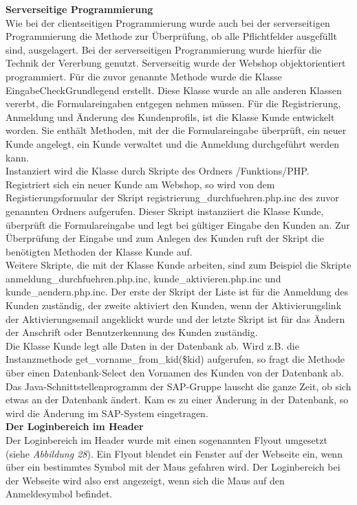 \textbf{Serverseitige Programmierung}\\
Wie bei der clientseitigen Programmierung wurde auch bei der serverseitigen Programmierung die Methode zur Überprüfung, ob alle Pflichtfelder ausgefüllt sind, ausgelagert. Bei der serverseitigen Programmierung wurde hierfür die Technik der Vererbung genutzt. Serverseitig wurde der Webshop objektorientiert programmiert. Für die zuvor genannte Methode wurde die Klasse \glqq EingabeCheckGrundlegend\grqq{} erstellt. Diese Klasse wurde an alle anderen Klassen vererbt, die Formulareingaben entgegen nehmen müssen. Für die Registrierung, Anmeldung und Änderung des Kundenprofils, ist die Klasse \glqq Kunde\grqq{} entwickelt worden. Sie enthält Methoden, mit der die Formulareingabe überprüft, ein neuer Kunde angelegt, ein Kunde verwaltet und die Anmeldung durchgeführt werden kann.\\
Instanziert wird die Klasse durch Skripte des Ordners \glqq /Funktions/PHP\grqq{}. Registriert sich ein neuer Kunde am Webshop, so wird von dem Registierungsformular der Skript \glqq registrierung\_durchfuehren.php.inc\grqq{} des zuvor genannten Ordners aufgerufen. Dieser Skript instanziiert die Klasse \glqq Kunde\grqq{}, überprüft die Formulareingabe und legt bei gültiger Eingabe den Kunden an. Zur Überprüfung der Eingabe und zum Anlegen des Kunden ruft der Skript die benötigten Methoden der Klasse \glqq Kunde\grqq{} auf.\\
Weitere Skripte, die mit der Klasse \glqq Kunde\grqq{} arbeiten, sind zum Beispiel die Skripte \glqq anmeldung\_durchfuehren.php.inc\grqq{}, \glqq kunde\_aktivieren.php.inc\grqq{} und \glqq kunde\_aendern.php.inc\grqq{}. Der erste der Skript der Liste ist für die Anmeldung des Kunden zuständig, der zweite aktiviert den Kunden, wenn der Aktivierungslink der Aktivierungsemail angeklickt wurde und der letzte Skript ist für das Ändern der Anschrift oder Benutzerkennung des Kunden zuständig.\\
Die Klasse \glqq Kunde\grqq{} legt alle Daten in der Datenbank ab. Wird z.B. die Instanzmethode \glqq get\_vorname\_from\_kid(\$kid)\grqq{} aufgerufen, so fragt die Methode über einen Datenbank-Select den Vornamen des Kunden von der Datenbank ab. Das Java-Schnittstellenprogramm der SAP-Gruppe lauscht die ganze Zeit, ob sich etwas an der Datenbank ändert. Kam es zu einer Änderung in der Datenbank, so wird die Änderung im SAP-System eingetragen.\\

\textbf{Der Loginbereich im Header}\\
Der Loginbereich im Header wurde mit einen sogenannten \glqq Flyout\grqq{} umgesetzt (siehe \textit{Abbildung 28}). Ein Flyout blendet ein Fenster auf der Webseite ein, wenn über ein bestimmtes Symbol mit der Maus gefahren wird. Der Loginbereich bei der Webseite wird also erst angezeigt, wenn sich die Maus auf den Anmeldesymbol befindet. 

